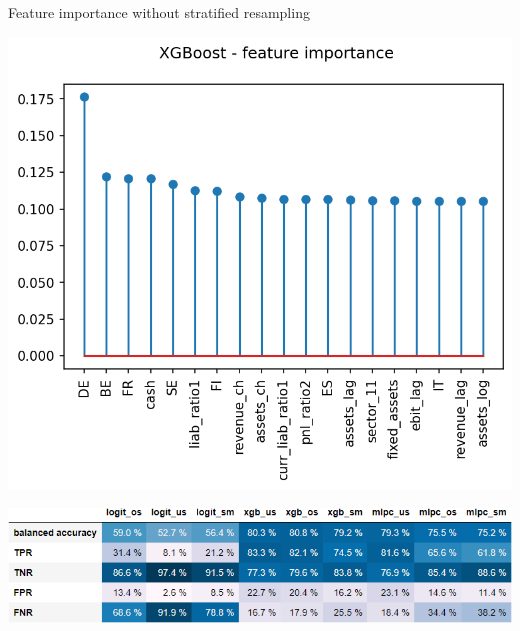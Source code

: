 \documentclass{beamer}
\begin{document}
\begin{frame}{Feature importance without stratified resampling}

\begin{center}
        \includegraphics[scale=0.42]{img/no_country_effect/xgb_exp.png}
\end{center}

\begin{center}
        \includegraphics[scale=0.35]{img/no_country_effect/balance_acc_table.png}
\end{center}

\end{frame}
\end{document}
